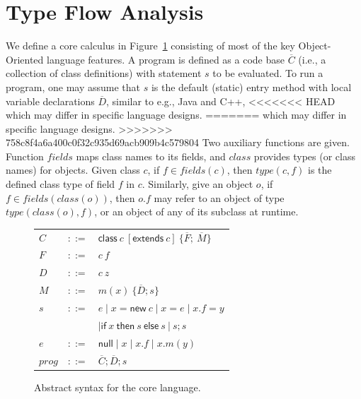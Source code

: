 \documentclass{llncs}
\newcommand{\keyword}[1]{\mathsf{#1}}
\newcommand{\kwnull}[0]{\keyword{null}}
\newcommand{\kwnew}[0]{\keyword{new}}
\newcommand{\kwextends}[0]{\keyword{extends}}
\newcommand{\kwclass}[0]{\keyword{class}}
\newcommand{\kwif}[0]{\keyword{if}}
\newcommand{\kwthen}[0]{\keyword{then}}
\newcommand{\kwelse}[0]{\keyword{else}}
\newcommand\Var{\mathtt{VAR}}
\newcommand\Val{\mathtt{V}}
\newcommand\Obj{\mathtt{OBJ}}
\newcommand\set[1]{\{#1\}}
\begin{document}
\section{Type Flow Analysis}\label{sec:type-flow-analysis}

We define a core calculus in Figure~\ref{fig:syntax} consisting of most of the key Object-Oriented language features.
A program is defined as a code base $\overline{C}$ (i.e., a collection of class definitions) with statement $s$ to be evaluated.
To run a program, one may assume that $s$ is the default (static) entry method with local variable declarations $\overline{D}$,
similar to e.g., Java and C++,
<<<<<<< HEAD
which may differ in specific language designs. 
=======
which may differ in specific language designs.
>>>>>>> 758c8f4a6a400c0f32c935d69acb909b4c579804
Two auxiliary functions are given. Function $fields$ maps class names to its fields, and $class$ provides types (or class names)
for objects.
Given class $c$, if $f\in fields(c)$, then $type(c,f)$ is the defined class type of field $f$ in $c$. Similarly, give an object $o$,
if $f\in fields(class(o))$, then $o.f$ may refer to an object of type $type(class(o),f)$, or an object of any of its subclass at runtime.

\begin{figure}[!htbp]\centering
	\begin{tabular}[c]{lll} %
		$C$&$::=$&$\kwclass\ c\ [\kwextends\ c] \ \{\overline{F};\ \overline{M}\}$\\
        $F$&$::=$&$c \ f$\\
        $D$&$::=$&$c \ z$\\
		$M$&$::=$&$m(x) \ \{\overline{D}; s\}$\\
		$s$&$::=$&$e\mid x{=}\kwnew \ c\mid  x {=} e \mid x.f{=}y $\\
		&&$ \mid \kwif \ x \ \kwthen \ s \ \kwelse \ s \ |\ s;s$\\
		$e$&$::=$&$ \kwnull\mid x \mid x.f \mid x.m(y) $\\
        $prog$&$::=$&$\overline{C};\overline{D}; s$\\
	\end{tabular}
	\caption{Abstract syntax for the core language. \label{fig:syntax}}
\end{figure}
\end{document}
